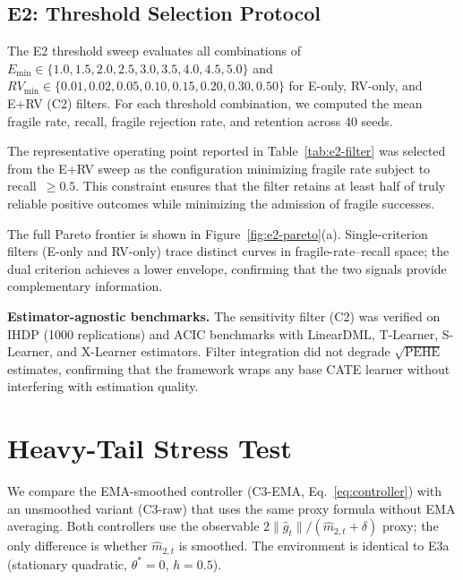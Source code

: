 \documentclass{article}
\begin{document}
\subsection{E2: Threshold Selection Protocol}
\label{sec:e2-supp}

The E2 threshold sweep evaluates all combinations of
$E_{\min} \in \{1.0, 1.5, 2.0, 2.5, 3.0, 3.5, 4.0, 4.5, 5.0\}$
and $RV_{\min} \in \{0.01, 0.02, 0.05, 0.10, 0.15, 0.20, 0.30, 0.50\}$
for E-only, RV-only, and E+RV (C2) filters. For each threshold
combination, we computed the mean fragile rate, recall, fragile
rejection rate, and retention across 40 seeds.

The representative operating point reported in
Table~\ref{tab:e2-filter} was selected from the E+RV sweep as the
configuration minimizing fragile rate subject to recall~$\geq 0.5$.
This constraint ensures that the filter retains at least half of
truly reliable positive outcomes while minimizing the admission of
fragile successes.

The full Pareto frontier is shown in
Figure~\ref{fig:e2-pareto}(a). Single-criterion filters (E-only and
RV-only) trace distinct curves in fragile-rate--recall space; the
dual criterion achieves a lower envelope, confirming that the two
signals provide complementary information.

\textbf{Estimator-agnostic benchmarks.}
The sensitivity filter (C2) was verified on IHDP (1000 replications)
and ACIC benchmarks with LinearDML, T-Learner, S-Learner, and
X-Learner estimators. Filter integration did not degrade
$\sqrt{\mathrm{PEHE}}$ estimates, confirming that the framework wraps
any base CATE learner without interfering with estimation quality.


\section{Heavy-Tail Stress Test}
\label{sec:e3b-app}

We compare the EMA-smoothed controller (C3-EMA, Eq.~\ref{eq:controller})
with an unsmoothed variant (C3-raw) that uses the same proxy formula
without EMA averaging. Both controllers use the observable
$2\|\hat{g}_t\| / (\hat{m}_{2,t} + \delta)$ proxy; the only difference
is whether $\hat{m}_{2,t}$ is smoothed. The environment is identical
to E3a (stationary quadratic, $\theta^*{=}0$, $h{=}0.5$).
\end{document}
